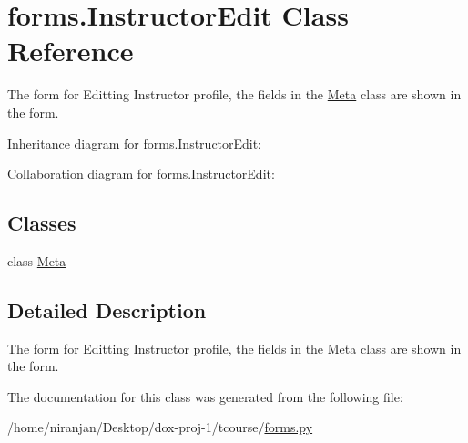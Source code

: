 \hypertarget{classforms_1_1_instructor_edit}{}\section{forms.\+Instructor\+Edit Class Reference}
\label{classforms_1_1_instructor_edit}


The form for Editting Instructor profile, the fields in the \hyperlink{classforms_1_1_instructor_edit_1_1_meta}{Meta} class are shown in the form.  




Inheritance diagram for forms.\+Instructor\+Edit\+:


Collaboration diagram for forms.\+Instructor\+Edit\+:
\subsection*{Classes}
\begin{DoxyCompactItemize}
\item 
class \hyperlink{classforms_1_1_instructor_edit_1_1_meta}{Meta}
\end{DoxyCompactItemize}


\subsection{Detailed Description}
The form for Editting Instructor profile, the fields in the \hyperlink{classforms_1_1_instructor_edit_1_1_meta}{Meta} class are shown in the form. 

The documentation for this class was generated from the following file\+:\begin{DoxyCompactItemize}
\item 
/home/niranjan/\+Desktop/dox-\/proj-\/1/tcourse/\hyperlink{forms_8py}{forms.\+py}\end{DoxyCompactItemize}
